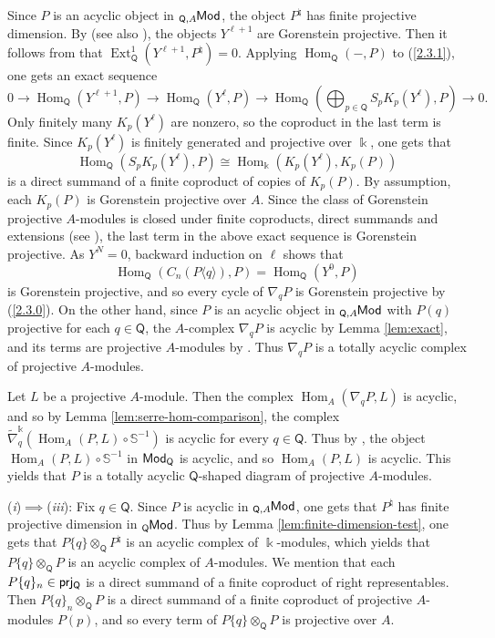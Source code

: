 \documentclass{amsart}
\theoremstyle{bfupright head,slanted body}
\theoremstyle{bfupright head,upright body}
\theoremstyle{fixed bf head,slanted body}
\theoremstyle{fixed bf head,upright body}
\theoremstyle{numbered paragraph}
\newcounter{eqc}
\newenvironment{prf*}[1][Proof]{%
	\begin{proof}[\bf #1]
		\setcounter{equation}{0}
		\renewcommand{\theequation}{\arabic{equation}}}
	{\end{proof}
}
\newcommand{\eqclbl}[1]{{\upshape(\textit{#1})}}
\newcommand{\proofofimp}[3][:]{\mbox{\eqclbl{#2}$\!\implies\!$\eqclbl{#3}#1}}
\numberwithin{equation}{res}
\newcommand{\Hom}{\operatorname{Hom}}
\newcommand{\Ext}[4][]{\operatorname{Ext}_{#1}^{#2}(#3,#4)}
\newcommand{\Q}{\mathsf{Q}}
\newcommand{\kk}{\Bbbk}
\newcommand{\lMod}[1]{{}_{#1}\mspace{-1mu}{\sf{Mod}}}
\newcommand{\rMod}[1]{{\sf{Mod}}_{#1}}
\newcommand{\nablaq}{\nabla_q}
\begin{document}
\begin{prf*}
Since $P$ is an acyclic object in $\lMod{\Q,A}$, the object $P^\natural$ has finite projective dimension. By \cite[Corollary 4.8]{DSS17} (see also \cite[Theorem B]{DLLM}), the objects $Y^{\ell+1}$ are Gorenstein projective. Then it follows from
\cite[Theorems 2.2 and 2.4]{HJ22} that $\Ext[\Q]{1}{Y^{\ell+1}}{P^\natural}=0$. Applying $\Hom_{\Q}(-,P)$ to (\ref{2.3.1}), one gets an exact sequence
$$0 \to \Hom_{\Q}(Y^{\ell+1},P)\to\Hom_{\Q}(Y^\ell,P) \to \Hom_{\Q}(\bigoplus_{p\in\Q}S_pK_p(Y^\ell),P) \to 0.$$
Only finitely many $K_p(Y^\ell)$ are nonzero, so the coproduct in the last term is finite. Since $K_p(Y^\ell)$ is finitely generated and projective over $\kk$, one gets that
$$\Hom_{\Q}(S_pK_p(Y^\ell),P)\cong\Hom_{\kk}(K_p(Y^\ell),K_p(P))$$
is a direct summand of a finite coproduct of copies of $K_p(P)$. By assumption, each $K_p(P)$ is Gorenstein projective over $A$. Since the class of Gorenstein projective $A$-modules is closed under finite coproducts, direct summands and extensions (see \cite[Theorem~2.5]{HHl04a}), the last term in the above exact sequence is Gorenstein projective. As $Y^N=0$, backward induction on $\ell$
shows that
$$\Hom_{\Q}(C_n(P\langle q\rangle),P)=\Hom_{\Q}(Y^0,P)$$
is Gorenstein projective, and so every cycle of $\nablaq P$ is Gorenstein projective by (\ref{2.3.0}). On the other hand, since $P$ is an acyclic object in $\lMod{\Q,A}$ with $P(q)$ projective for each $q\in\Q$, the $A$-complex $\nablaq P$ is acyclic by Lemma \ref{lem:exact}, and its terms are projective $A$-modules by \cite[Lemma 3.5$(ii)$]{HJ26}. Thus $\nablaq P$ is a totally acyclic complex of projective $A$-modules.

Let $L$ be a projective $A$-module. Then the complex $\Hom_A(\nabla_qP,L)$ is acyclic, and so by Lemma \ref{lem:serre-hom-comparison}, the complex $\widetilde{\nabla}_q^{\kk}(\Hom_A(P,L)\circ\mathbb S^{-1})$ is acyclic for every $q\in\Q$. Thus by \cite[Lemma 3.12]{HJ26}, the object $\Hom_A(P,L)\circ\mathbb S^{-1}$ in $\rMod{\Q}$ is acyclic, and so $\Hom_A(P,L)$ is acyclic. This yields that $P$ is a totally acyclic
$\Q$-shaped diagram of projective $A$-modules.

\proofofimp{i}{iii} Fix $q\in\Q$. Since $P$ is acyclic in $\lMod{\Q,A}$, one gets that $P^\natural$ has finite projective dimension in $\lMod{\Q}$. Thus by Lemma \ref{lem:finite-dimension-test}, one gets that
$P\{q\}\otimes_{\Q}P^\natural$ is an acyclic complex of $\kk$-modules, which yields that $P\{q\}\otimes_{\Q}P$ is an acyclic complex of $A$-modules. We mention that each $P\{q\}_n\in\sf prj_\Q$ is a direct summand of a finite coproduct of right representables. Then $P\{q\}_n\otimes_{\Q}P$ is a direct summand of a finite coproduct of projective $A$-modules $P(p)$, and so every term of $P\{q\}\otimes_{\Q}P$ is projective over $A$.


\end{prf*}
\end{document}

